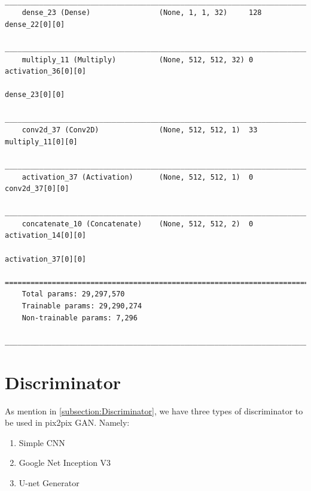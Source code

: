 {\begin{verbatim}
    __________________________________________________________________________________________________
    dense_23 (Dense)                (None, 1, 1, 32)     128         dense_22[0][0]                   
    __________________________________________________________________________________________________
    multiply_11 (Multiply)          (None, 512, 512, 32) 0           activation_36[0][0]              
                                                                        dense_23[0][0]                   
    __________________________________________________________________________________________________
    conv2d_37 (Conv2D)              (None, 512, 512, 1)  33          multiply_11[0][0]                
    __________________________________________________________________________________________________
    activation_37 (Activation)      (None, 512, 512, 1)  0           conv2d_37[0][0]                  
    __________________________________________________________________________________________________
    concatenate_10 (Concatenate)    (None, 512, 512, 2)  0           activation_14[0][0]              
                                                                        activation_37[0][0]              
    ==================================================================================================
    Total params: 29,297,570
    Trainable params: 29,290,274
    Non-trainable params: 7,296
    __________________________________________________________________________________________________
                                \end{verbatim}
                }
        \section{Discriminator}
            As mention in \ref{subsection:Discriminator}, we have three types of discriminator to be used in pix2pix GAN. Namely: 
            \begin{enumerate}[label=\alph*.]
                \item Simple CNN 
                \item Google Net Inception V3
                \item U-net Generator
            \end{enumerate}
